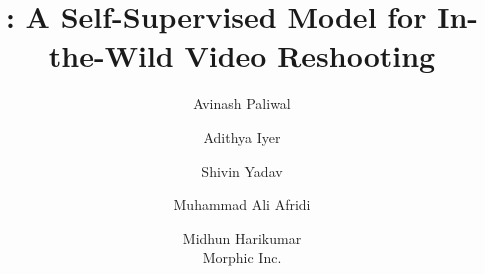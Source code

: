 \documentclass[10pt,twocolumn,letterpaper]{article}
\title{\method{}: A Self-Supervised Model for In-the-Wild Video Reshooting}
\author{Avinash Paliwal\and
Adithya Iyer\and
Shivin Yadav\and
Muhammad Ali Afridi\and
Midhun Harikumar\\
{\normalsize Morphic Inc.}\\
}
\begin{document}
%     
% 
% 
% 
% 
% 
% 

%     
%     

% 



{
    \small
    
    
}
\end{document}
